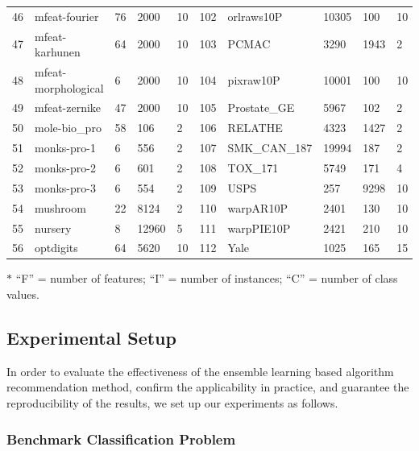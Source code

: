 \documentclass[acmsmall]{acmart}
\begin{document}
\begin{table}[!h]
{\begin{threeparttable}
\begin{tabular}{l l l l l | l l l l l}
				46 & mfeat-fourier & 76 & 2000 & 10 & 102 & orlraws10P & 10305 & 100 & 10\\
				47 & mfeat-karhunen & 64 & 2000 & 10 & 103 & PCMAC & 3290 & 1943 & 2\\
				48 & mfeat-morphological & 6 & 2000 & 10 & 104 & pixraw10P & 10001 & 100 & 10\\
				49 & mfeat-zernike & 47 & 2000 & 10 & 105 & Prostate\_GE & 5967 & 102 & 2\\
				50 & mole-bio\_pro & 58 & 106 & 2 & 106 & RELATHE & 4323 & 1427 & 2\\
				51 & monks-pro-1 & 6 & 556 & 2 & 107 & SMK\_CAN\_187 & 19994 & 187 & 2\\
				52 & monks-pro-2 & 6 & 601 & 2 & 108 & TOX\_171  & 5749 & 171 & 4\\
				53 & monks-pro-3 & 6 & 554 & 2 & 109 & USPS & 257 & 9298 & 10\\
				54 & mushroom & 22 & 8124 & 2 & 110 & warpAR10P  & 2401 & 130 & 10\\
				55 & nursery & 8 & 12960 & 5 & 111 & warpPIE10P & 2421 & 210 & 10\\
				56 & optdigits & 64 & 5620 & 10 & 112 & Yale & 1025 & 165 & 15\\
				\hline
			\end{tabular}
			\begin{tablenotes}
				\footnotesize
				\item [$\ast$] ``F'' = number of features;
				``I'' = number of instances; ``C'' = number of class values.
			\end{tablenotes}
		\end{threeparttable}
	}
\end{table}

\subsection{Experimental Setup}

In order to evaluate the effectiveness of the ensemble learning
based algorithm recommendation method, confirm the applicability in
practice, and guarantee the reproducibility of the results, we set
up our experiments as follows.

\subsubsection{Benchmark Classification Problem}
\end{document}

